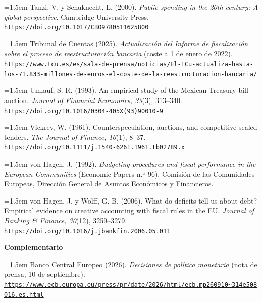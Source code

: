 \documentclass[10pt,a4paper]{article}
\begin{document}
\noindent\hangindent=1.5em Tanzi, V. y Schuknecht, L. (2000). \textit{Public spending in the 20th century: A global perspective}. Cambridge University Press. \href{https://doi.org/10.1017/CBO9780511625800}{\nolinkurl{https://doi.org/10.1017/CBO9780511625800}}

\noindent\hangindent=1.5em Tribunal de Cuentas (2025). \textit{Actualización del Informe de fiscalización sobre el proceso de reestructuración bancaria} (coste a 1 de enero de 2022). \href{https://www.tcu.es/es/sala-de-prensa/noticias/El-TCu-actualiza-hasta-los-71.833-millones-de-euros-el-coste-de-la-reestructuracion-bancaria/}{\nolinkurl{https://www.tcu.es/es/sala-de-prensa/noticias/El-TCu-actualiza-hasta-los-71.833-millones-de-euros-el-coste-de-la-reestructuracion-bancaria/}}

\noindent\hangindent=1.5em Umlauf, S. R. (1993). An empirical study of the Mexican Treasury bill auction. \textit{Journal of Financial Economics, 33}(3), 313--340. \href{https://doi.org/10.1016/0304-405X(93)90010-9}{\nolinkurl{https://doi.org/10.1016/0304-405X(93)90010-9}}

\noindent\hangindent=1.5em Vickrey, W. (1961). Counterspeculation, auctions, and competitive sealed tenders. \textit{The Journal of Finance, 16}(1), 8--37. \href{https://doi.org/10.1111/j.1540-6261.1961.tb02789.x}{\nolinkurl{https://doi.org/10.1111/j.1540-6261.1961.tb02789.x}}

\noindent\hangindent=1.5em von Hagen, J. (1992). \textit{Budgeting procedures and fiscal performance in the European Communities} (Economic Papers n.º 96). Comisión de las Comunidades Europeas, Dirección General de Asuntos Económicos y Financieros.

\noindent\hangindent=1.5em von Hagen, J. y Wolff, G. B. (2006). What do deficits tell us about debt? Empirical evidence on creative accounting with fiscal rules in the EU. \textit{Journal of Banking \& Finance, 30}(12), 3259--3279. \href{https://doi.org/10.1016/j.jbankfin.2006.05.011}{\nolinkurl{https://doi.org/10.1016/j.jbankfin.2006.05.011}}

\bigskip
{\bfseries\large Complementario\par}
\medskip

\noindent\hangindent=1.5em Banco Central Europeo (2026). \textit{Decisiones de política monetaria} (nota de prensa, 10 de septiembre). \href{https://www.ecb.europa.eu/press/pr/date/2026/html/ecb.mp260910~314e508016.es.html}{\nolinkurl{https://www.ecb.europa.eu/press/pr/date/2026/html/ecb.mp260910~314e508016.es.html}}
\end{document}
